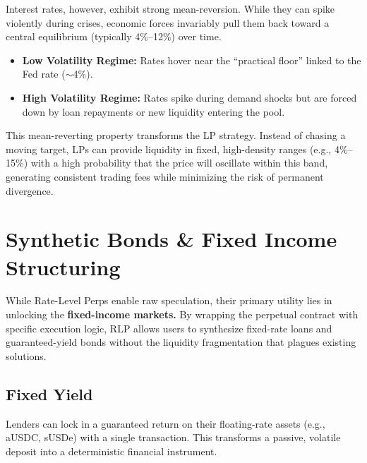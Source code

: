 \documentclass[12pt]{article}
\begin{document}
Interest rates, however, exhibit strong mean-reversion. While they can spike violently during crises, economic forces invariably pull them back toward a central equilibrium (typically 4\%--12\%) over time.

\begin{itemize}
    \item \textbf{Low Volatility Regime:} Rates hover near the ``practical floor'' linked to the Fed rate ($\sim$4\%).
    \item \textbf{High Volatility Regime:} Rates spike during demand shocks but are forced down by loan repayments or new liquidity entering the pool.
\end{itemize}

This mean-reverting property transforms the LP strategy. Instead of chasing a moving target, LPs can provide liquidity in fixed, high-density ranges (e.g., 4\%--15\%) with a high probability that the price will oscillate within this band, generating consistent trading fees while minimizing the risk of permanent divergence.

\section{Synthetic Bonds \& Fixed Income Structuring}

While Rate-Level Perps enable raw speculation, their primary utility lies in unlocking the \textbf{fixed-income markets.} By wrapping the perpetual contract with specific execution logic, RLP allows users to synthesize fixed-rate loans and guaranteed-yield bonds without the liquidity fragmentation that plagues existing solutions.

\subsection{Fixed Yield}

Lenders can lock in a guaranteed return on their floating-rate assets (e.g., aUSDC, sUSDe) with a single transaction. This transforms a passive, volatile deposit into a deterministic financial instrument.
\end{document}
